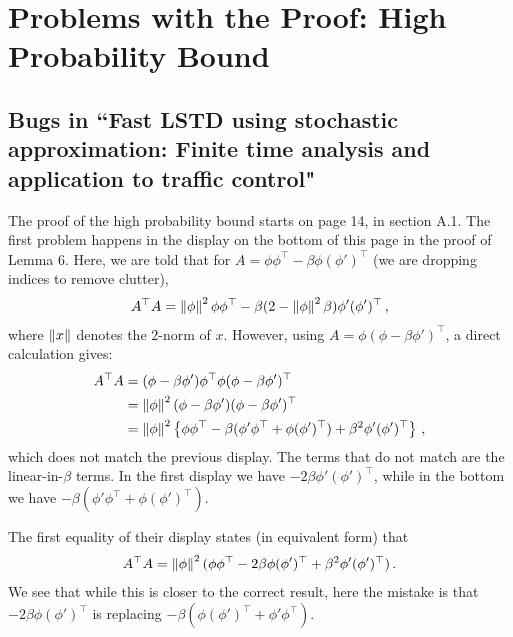 \documentclass{article}
\begin{document}
\section{Problems with the Proof: High Probability Bound}
\subsection{Bugs in ``Fast LSTD using stochastic approximation: Finite time analysis and application to traffic control"}
The proof of the high probability bound starts on page 14, in section A.1.
The first problem happens in the display on the bottom of this page in the proof of Lemma 6.
Here, we are told that for $A = \phi \phi^\top - \beta \phi (\phi')^\top$ (we are dropping indices to remove clutter),
\begin{align*}
A^\top A = \left\| \phi\right\|^2 \phi \phi^\top - \beta ( 2 - \left\| \phi\right\|^2\beta ) \phi' (\phi')^\top\,,
\end{align*}
where $\left\| x\right\|$ denotes the $2$-norm of $x$.
However, using $A = \phi( \phi-\beta \phi')^\top$, a direct calculation gives:
\begin{align*}
A^\top A 
& = ( \phi-\beta \phi') \phi^\top \phi ( \phi-\beta \phi')^\top \\
& = \left\| \phi\right\|^2  ( \phi-\beta \phi') ( \phi-\beta \phi')^\top \\
& = \left\| \phi\right\|^2  \left\{ \phi \phi^\top-\beta (\phi' \phi^\top + \phi (\phi')^\top) + \beta^2 \phi' (\phi')^\top \right\}\,,
\end{align*}
which does not match the previous display.
The terms that do not match are the linear-in-$\beta$ terms.
In the first display we have $ -2 \beta \phi' (\phi')^\top$, while in the bottom we have $-\beta (\phi' \phi^\top + \phi (\phi')^\top)$.

The first equality of their display states (in equivalent form) that 
\begin{align*}
A^\top A = \left\| \phi\right\|^2 ( \phi \phi^\top - 2\beta \phi (\phi')^\top +\beta^2 \phi' (\phi')^\top )\,.
\end{align*}
We see that while this is closer to the correct result, here the mistake is that $-2\beta \phi  (\phi')^\top$ is replacing $-\beta(\phi (\phi')^\top + \phi' \phi^\top)$.
\begin{comment}
We also have a hard time following the rest of the proof of this lemma.
In fact, we have a simple proof for a result similar to stated in this lemma.
This works by observing that one needs to 
bound the Lipschitz factor of $\theta \mapsto \bar T_n \dots \bar T_{t+1} ( (I-\gamma_t A_t)\theta + b_t )$, where
$A_t = \phi_t (\phi_t -\beta \phi_t')^\top$, $b_t = r_{i_t} \phi_t$ and
 $\bar T_t(\theta) = (I-\gamma_t \bar A_T) \theta + \bar b_T$ (we assume that the stepsize sequence is deterministic).
 Clearly, this Lipschitz factor can be bounded by $\prod_{s=t+1}^n \norm{I-\gamma_s \bar A_T}_2 \norm{I-\gamma_t A_t}_2$
 (the composition of Lipschitz maps is Lipschitz with a factor that is the product of the individual maps' Lipschitz factors). 
Invoking (A3) then indeed gives some version of Lemma 7.
By making an appropriate assumption (similar to those used in our paper), 
$\prod_{s=t+1}^n \norm{I-\gamma_s \bar A_T}_2 $ can be controlled.
\end{comment}
\end{document}
